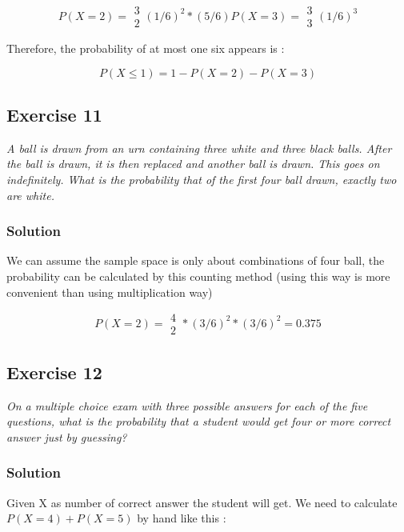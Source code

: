 \documentclass[12pt,a4paper]{article}
\begin{document}
\[
P(X=2) = \begin{array}{c}
3 \\
2
\end{array} (1/6)^2 * (5/6)
P(X=3) = \begin{array}{c}
3 \\
3
\end{array} (1/6)^3
\]

Therefore, the probability of at most one six appears is :

\[
P(X\leq1) = 1 - P(X=2) - P(X=3)
\]

\subsection{Exercise 11}

\textit{A ball is drawn from an urn containing three white and three black balls. After the ball is drawn, it is then replaced and another ball is drawn. This goes on indefinitely. What is the probability that of the first four ball drawn, exactly two are white.}

\subsubsection{Solution}

We can assume the sample space is only about combinations of four ball, the probability can be calculated by this counting method (using this way is more convenient than using multiplication way)

\[
P(X=2) = \begin{array}{c}
4 \\
2
\end{array}
 * (3/6)^2 * (3/6)^2 = 0.375
\]


\subsection{Exercise 12}

\textit{On a multiple choice exam with three possible answers for each of the five questions, what is the probability that a student would get four or more correct answer just by guessing?}

\subsubsection{Solution}

Given X as number of correct answer the student will get. We need to calculate $P(X = 4) + P(X = 5)$ by hand like this :
\end{document}
